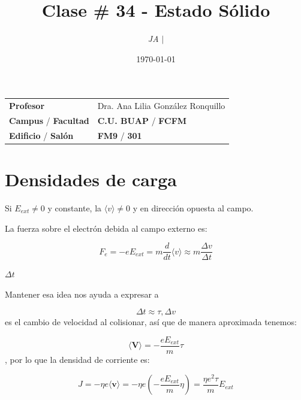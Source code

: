 \documentclass{article}
\title{Clase \# 34 - Estado Sólido}
\author{\emph{JA} $\boldsymbol{\mid}$}
\date{\today}
\begin{document}
\maketitle



\begin{mybox}
\noindent\begin{tabular}{@{}ll}
	{\bfseries{Profesor}} & Dra. Ana Lilia González Ronquillo\\
	\textcolor{prussianblue}{\bfseries{Campus}} / \textcolor{trueblue}{\bfseries{Facultad}}  & \textcolor{prussianblue}{\bfseries{C.U. BUAP}} /  \textcolor{trueblue}{\bfseries{FCFM}} \\
	\textcolor{prussianblue}{\bfseries{Edificio}} /  \textcolor{trueblue}{\bfseries{Salón}}    & 	\textcolor{prussianblue}{\bfseries{FM9}} /  \textcolor{trueblue}{\bfseries{301}}   
\end{tabular} 
\end{mybox} \vspace{1cm}

\tableofcontents

\vspace{2cm}

\section{Densidades de carga} \vspace{0.5cm}


Si $E_{ext} \neq 0$ y constante, la $\langle v \rangle \neq 0$ y en dirección opuesta al campo.

La fuerza sobre el electrón debida al campo externo es:

\[ F_{e} = -eE_{ext} = m \frac{d}{dt} \langle v \rangle \approx m \frac{\Delta{v}}{\Delta{t}}   \]



$\Delta{t}$

Mantener esa idea nos ayuda a expresar a 

\[ \Delta{t} \approx \tau, \Delta{v}  \] es el cambio de velocidad al colisionar, así que de manera aproximada tenemos:

\[\langle \mathbf{V} \rangle = - \frac{ eE_{ext}  }{m}\tau \], por lo que la densidad de corriente es:


\[  J = -\eta e \langle \mathbf{v} \rangle = -\eta e \left(   - \frac{eE_{ext}}{m} \eta  \right)  = \frac{ \eta e^{2}\tau }{m} E_{ext}  \]
\end{document}
